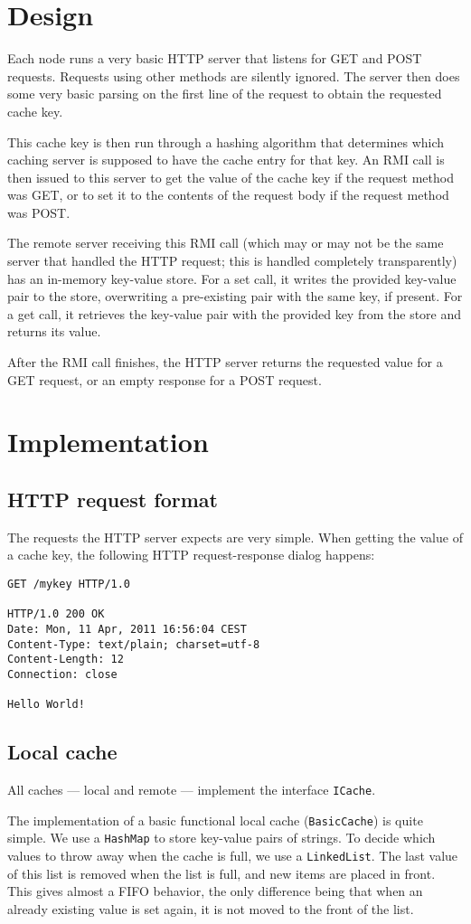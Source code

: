 \documentclass[11pt]{article}
\begin{document}
\section*{Design}
Each node runs a very basic HTTP server that listens for GET and POST requests. Requests using
other methods are silently ignored. The server then does some very basic parsing on the first line
of the request to obtain the requested cache key.

This cache key is then run through a hashing algorithm that determines which caching server is
supposed to have the cache entry for that key. An RMI call is then issued to this server to
get the value of the cache key if the request method was GET, or to set it to the contents
of the request body if the request method was POST.

The remote server receiving this RMI call (which may or may not be the same server that
handled the HTTP request; this is handled completely transparently) has an in-memory
key-value store. For a set call, it writes the provided key-value pair to the store,
overwriting a pre-existing pair with the same key, if present. For a get call, it
retrieves the key-value pair with the provided key from the store and returns its
value.

After the RMI call finishes, the HTTP server returns the requested value for a GET
request, or an empty response for a POST request.

\section*{Implementation}
\subsection*{HTTP request format}
The requests the HTTP server expects are very simple. When getting the value of a
cache key, the following HTTP request-response dialog happens:

\begin{lstlisting}
GET /mykey HTTP/1.0

HTTP/1.0 200 OK 
Date: Mon, 11 Apr, 2011 16:56:04 CEST
Content-Type: text/plain; charset=utf-8
Content-Length: 12
Connection: close

Hello World!
\end{lstlisting}

\subsection*{Local cache}
All caches --- local and remote --- implement the interface \texttt{ICache}.

The implementation of a basic functional local cache (\texttt{BasicCache}) is quite simple. We use a \texttt{HashMap} to store key-value pairs of strings. To decide which values to throw away when the cache is full, we use a \texttt{LinkedList}. The last value of this list is removed when the list is full, and new items are placed in front. This gives almost a FIFO behavior, the only difference being that when an already existing value is set again, it is not moved to the front of the list.
\end{document}

